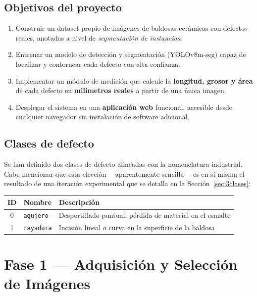 \documentclass[12pt,a4paper]{article}
\begin{document}
\subsection{Objetivos del proyecto}

\begin{enumerate}[leftmargin=1.5cm]
  \item Construir un dataset propio de imágenes de baldosas cerámicas con defectos
        reales, anotadas a nivel de \emph{segmentación de instancias}.
  \item Entrenar un modelo de detección y segmentación (YOLOv8m-seg) capaz de
        localizar y contornear cada defecto con alta confianza.
  \item Implementar un módulo de medición que calcule la \textbf{longitud, grosor y
        área} de cada defecto en \textbf{milímetros reales} a partir de una única imagen.
  \item Desplegar el sistema en una \textbf{aplicación web} funcional, accesible
        desde cualquier navegador sin instalación de software adicional.
\end{enumerate}

\subsection{Clases de defecto}

Se han definido dos clases de defecto alineadas con la nomenclatura industrial. Cabe
mencionar que esta elección —aparentemente sencilla— es en sí misma el resultado de
una iteración experimental que se detalla en la Sección~\ref{sec:3clases}:

\begin{center}
\begin{tabular}{cll}
  \toprule
  \textbf{ID} & \textbf{Nombre} & \textbf{Descripción} \\
  \midrule
  0 & \texttt{agujero}  & Desportillado puntual; pérdida de material en el esmalte \\
  1 & \texttt{rayadura} & Incisión lineal o curva en la superficie de la baldosa \\
  \bottomrule
\end{tabular}
\end{center}

\section{Fase 1 — Adquisición y Selección de Imágenes}
\end{document}
